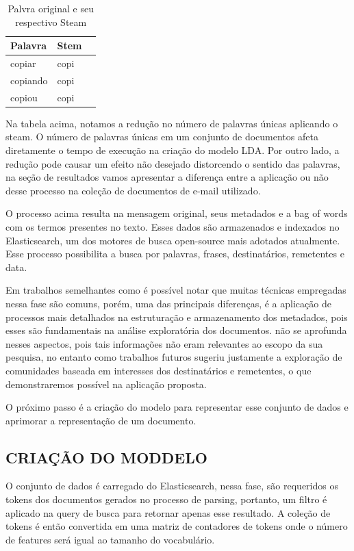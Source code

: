 \documentclass[12pt,a4paper]{article}
\begin{document}
\begin{enumerate}
  
  \begin{table}[h]
    \centering
    \begin{tabular}{l l l}
    Palavra		&Stem &\\
    \hline
    copiar		&copi &\\
    copiando		&copi &\\
    copiou		&copi &\\
    \hline
    \end{tabular}
    \caption{Palvra original e seu respectivo Steam}
  \end{table}
  
  Na tabela acima, notamos a redução no número de palavras únicas aplicando o steam. O número de palavras únicas em um conjunto de documentos afeta diretamente o tempo de execução na criação do modelo LDA. Por outro lado, a redução pode causar um efeito não desejado distorcendo o sentido das palavras, na seção de resultados vamos apresentar a diferença entre a aplicação ou não desse processo na coleção de documentos de e-mail utilizado.
  \end{enumerate}
  
  
  O processo acima resulta na mensagem original, seus metadados e a bag of words com os termos presentes no texto. Esses dados são armazenados e indexados no Elasticsearch, um dos motores de busca open-source mais adotados atualmente. Esse processo possibilita a busca por palavras, frases, destinatários, remetentes e data. 
  
  Em trabalhos semelhantes como  é possível notar que muitas técnicas empregadas nessa fase são comuns, porém, uma das principais diferenças, é a aplicação de processos mais detalhados na estruturação e armazenamento dos metadados, pois esses são fundamentais na análise exploratória dos documentos.  não se aprofunda nesses aspectos, pois tais informações não eram relevantes ao escopo da sua pesquisa, no entanto como trabalhos futuros sugeriu justamente a exploração de comunidades baseada em interesses dos destinatários e remetentes, o que demonstraremos possível na aplicação proposta.
  
  O próximo passo é a criação do modelo para representar esse conjunto de dados e aprimorar a representação de um documento.
  
  
  
  \subsection{CRIAÇÃO DO MODDELO}
  O conjunto de dados é carregado do Elasticsearch, nessa fase, são requeridos os tokens dos documentos gerados no processo de parsing, portanto, um filtro é aplicado na query de busca para retornar apenas esse resultado. A coleção de tokens é então convertida em uma matriz de contadores de tokens onde o número de features será igual ao tamanho do vocabulário.
  
\end{document}
